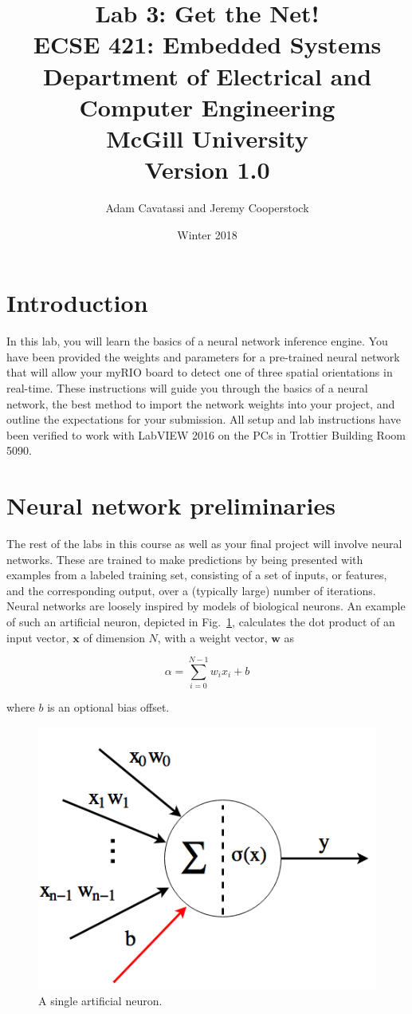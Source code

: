 \documentclass{article}
\title{Lab 3: Get the Net!\\
  \large ECSE 421: Embedded Systems \\ Department of Electrical and Computer Engineering \\ McGill University \\ Version 1.0}
\author{Adam Cavatassi and Jeremy Cooperstock}
\date{Winter 2018}
\begin{document}
\maketitle

\section{Introduction}
In this lab, you will learn the basics of a neural network inference engine. You have been provided the weights and parameters for a pre-trained neural network that will allow your myRIO board to detect one of three spatial orientations in real-time. These instructions will guide you through the basics of a neural network, the best method to import the network weights into your project, and outline the expectations for your submission. All setup and lab instructions have been verified to work with LabVIEW 2016 on the PCs in Trottier Building Room 5090. 

\section{Neural network preliminaries}

The rest of the labs in this course as well as your final project will involve neural networks. These are trained to make predictions by being presented with examples from a labeled training set, consisting of a set of inputs, or features, and the corresponding output, over a (typically large) number of iterations.
Neural networks are loosely inspired by models of biological neurons. An example of such an artificial neuron, depicted in Fig.~\ref{fig:perceptron}, calculates the dot product of an input vector, $\mathbf{x}$ of dimension $N$, with a weight vector, $\mathbf{w}$ as

\begin{equation}
    \alpha = \sum\limits_{i=0}^{N-1} w_i x_i + b
\end{equation}

where $b$ is an optional bias offset. 

\begin{figure}[h]
\centering
\includegraphics[scale=0.6]{figs/perceptron.png}
\caption{A single artificial neuron.}
\label{fig:perceptron}
\end{figure}
\end{document}
